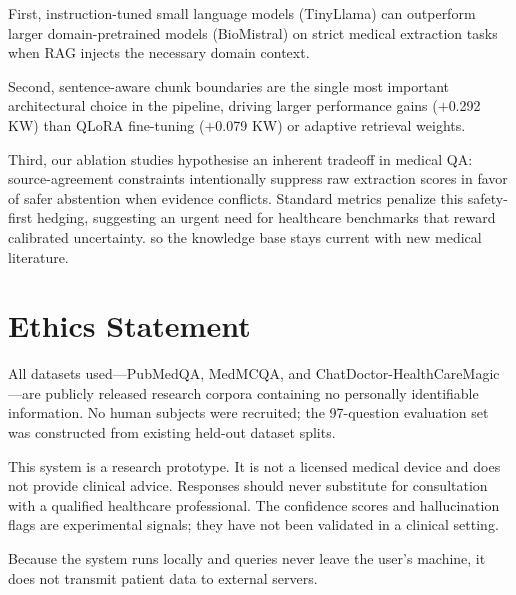 \documentclass[conference,a4paper]{IEEEtran}
\begin{document}
First, instruction-tuned small language models (TinyLlama) can outperform
larger domain-pretrained models (BioMistral) on strict medical extraction 
tasks when RAG injects the necessary domain context.

Second, sentence-aware chunk boundaries are the single most important 
architectural choice in the pipeline, driving larger performance gains 
($+$0.292 KW) than QLoRA fine-tuning ($+$0.079 KW) or adaptive retrieval 
weights.

Third, our ablation studies hypothesise an inherent tradeoff in medical 
QA: source-agreement constraints intentionally suppress raw extraction 
scores in favor of safer abstention when evidence conflicts. Standard 
metrics penalize this safety-first hedging, suggesting an urgent need 
for healthcare benchmarks that reward calibrated uncertainty.
so the knowledge base stays current with new medical literature.

\section*{Ethics Statement}

All datasets used---PubMedQA, MedMCQA, and
ChatDoctor-HealthCareMagic---are publicly released research corpora
containing no personally identifiable information.
No human subjects were recruited; the 97-question evaluation set was
constructed from existing held-out dataset splits.

This system is a research prototype.
It is not a licensed medical device and does not provide clinical advice.
Responses should never substitute for consultation with a qualified
healthcare professional.
The confidence scores and hallucination flags are experimental signals;
they have not been validated in a clinical setting.

Because the system runs locally and queries never leave the user's
machine, it does not transmit patient data to external servers.
\end{document}
